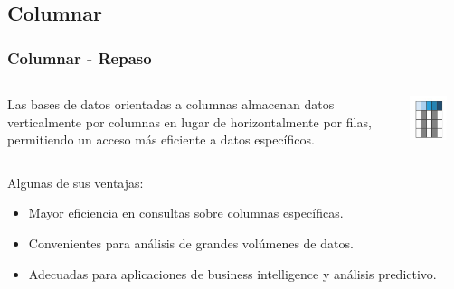 \subsection{Columnar}

\begin{frame}
    \frametitle{Columnar - Repaso}
    
    \begin{columns}
        \begin{column}{0.64\textwidth}
            Las bases de datos orientadas a columnas almacenan datos verticalmente por columnas en lugar de horizontalmente por filas, permitiendo un acceso más eficiente a datos específicos.
        \end{column}
        \begin{column}{0.34\textwidth}
            \centering
            \includegraphics[width=0.7\textwidth]{images/Columnar.png}
        \end{column}
    \end{columns}

     
    
    Algunas de sus ventajas:

     
    
    \begin{itemize}
        \item  Mayor eficiencia en consultas sobre columnas específicas.  
        \item  Convenientes para análisis de grandes volúmenes de datos.  
        \item  Adecuadas para aplicaciones de business intelligence y análisis predictivo.
    \end{itemize}
    
\end{frame}

